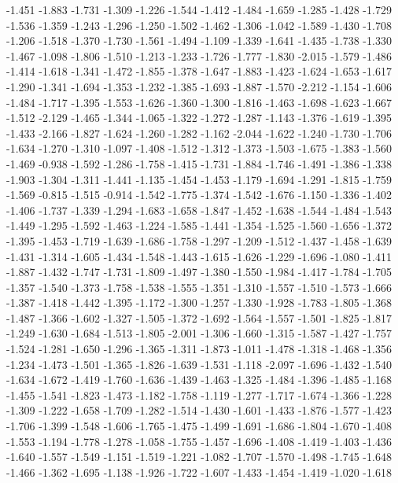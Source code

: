 \documentclass[9pt]{article}
\theoremstyle{plain}
\theoremstyle{definition}
\theoremstyle{remark}
\numberwithin{equation}{section}
\begin{document}
-1.451
-1.883
-1.731
-1.309
-1.226
-1.544
-1.412
-1.484
-1.659
-1.285
-1.428
-1.729
-1.536
-1.359
-1.243
-1.296
-1.250
-1.502
-1.462
-1.306
-1.042
-1.589
-1.430
-1.708
-1.206
-1.518
-1.370
-1.730
-1.561
-1.494
-1.109
-1.339
-1.641
-1.435
-1.738
-1.330
-1.467
-1.098
-1.806
-1.510
-1.213
-1.233
-1.726
-1.777
-1.830
-2.015
-1.579
-1.486
-1.414
-1.618
-1.341
-1.472
-1.855
-1.378
-1.647
-1.883
-1.423
-1.624
-1.653
-1.617
-1.290
-1.341
-1.694
-1.353
-1.232
-1.385
-1.693
-1.887
-1.570
-2.212
-1.154
-1.606
-1.484
-1.717
-1.395
-1.553
-1.626
-1.360
-1.300
-1.816
-1.463
-1.698
-1.623
-1.667
-1.512
-2.129
-1.465
-1.344
-1.065
-1.322
-1.272
-1.287
-1.143
-1.376
-1.619
-1.395
-1.433
-2.166
-1.827
-1.624
-1.260
-1.282
-1.162
-2.044
-1.622
-1.240
-1.730
-1.706
-1.634
-1.270
-1.310
-1.097
-1.408
-1.512
-1.312
-1.373
-1.503
-1.675
-1.383
-1.560
-1.469
-0.938
-1.592
-1.286
-1.758
-1.415
-1.731
-1.884
-1.746
-1.491
-1.386
-1.338
-1.903
-1.304
-1.311
-1.441
-1.135
-1.454
-1.453
-1.179
-1.694
-1.291
-1.815
-1.759
-1.569
-0.815
-1.515
-0.914
-1.542
-1.775
-1.374
-1.542
-1.676
-1.150
-1.336
-1.402
-1.406
-1.737
-1.339
-1.294
-1.683
-1.658
-1.847
-1.452
-1.638
-1.544
-1.484
-1.543
-1.449
-1.295
-1.592
-1.463
-1.224
-1.585
-1.441
-1.354
-1.525
-1.560
-1.656
-1.372
-1.395
-1.453
-1.719
-1.639
-1.686
-1.758
-1.297
-1.209
-1.512
-1.437
-1.458
-1.639
-1.431
-1.314
-1.605
-1.434
-1.548
-1.443
-1.615
-1.626
-1.229
-1.696
-1.080
-1.411
-1.887
-1.432
-1.747
-1.731
-1.809
-1.497
-1.380
-1.550
-1.984
-1.417
-1.784
-1.705
-1.357
-1.540
-1.373
-1.758
-1.538
-1.555
-1.351
-1.310
-1.557
-1.510
-1.573
-1.666
-1.387
-1.418
-1.442
-1.395
-1.172
-1.300
-1.257
-1.330
-1.928
-1.783
-1.805
-1.368
-1.487
-1.366
-1.602
-1.327
-1.505
-1.372
-1.692
-1.564
-1.557
-1.501
-1.825
-1.817
-1.249
-1.630
-1.684
-1.513
-1.805
-2.001
-1.306
-1.660
-1.315
-1.587
-1.427
-1.757
-1.524
-1.281
-1.650
-1.296
-1.365
-1.311
-1.873
-1.011
-1.478
-1.318
-1.468
-1.356
-1.234
-1.473
-1.501
-1.365
-1.826
-1.639
-1.531
-1.118
-2.097
-1.696
-1.432
-1.540
-1.634
-1.672
-1.419
-1.760
-1.636
-1.439
-1.463
-1.325
-1.484
-1.396
-1.485
-1.168
-1.455
-1.541
-1.823
-1.473
-1.182
-1.758
-1.119
-1.277
-1.717
-1.674
-1.366
-1.228
-1.309
-1.222
-1.658
-1.709
-1.282
-1.514
-1.430
-1.601
-1.433
-1.876
-1.577
-1.423
-1.706
-1.399
-1.548
-1.606
-1.765
-1.475
-1.499
-1.691
-1.686
-1.804
-1.670
-1.408
-1.553
-1.194
-1.778
-1.278
-1.058
-1.755
-1.457
-1.696
-1.408
-1.419
-1.403
-1.436
-1.640
-1.557
-1.549
-1.151
-1.519
-1.221
-1.082
-1.707
-1.570
-1.498
-1.745
-1.648
-1.466
-1.362
-1.695
-1.138
-1.926
-1.722
-1.607
-1.433
-1.454
-1.419
-1.020
-1.618
\end{document}
